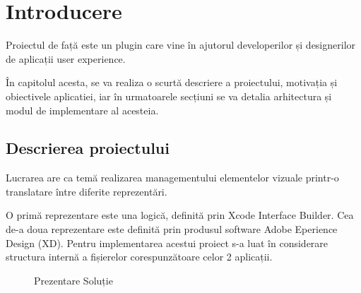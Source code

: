 \chapter{Introducere}
\label{chapter:intro}

\par Proiectul de față este un plugin care vine în ajutorul developerilor și designerilor de aplicații user experience.
\par În capitolul acesta, se va realiza o scurtă descriere a proiectului, motivația și obiectivele aplicatiei, iar  în urmatoarele secțiuni se va detalia arhitectura și modul de implementare al acesteia.

\section{Descrierea proiectului}
\label{sec:proj}
\par Lucrarea are ca temă realizarea managementului elementelor vizuale printr-o translatare între diferite reprezentări.  
\par O primă reprezentare este una logică, definită prin Xcode Interface Builder. Cea de-a doua reprezentare este definită prin produsul software Adobe Eperience Design (XD). 
Pentru implementarea acestui proiect s-a luat în considerare structura internă a fișierelor corespunzătoare celor 2 aplicații.

\begin{figure}[!htbp]
\centering
{}
\caption{Prezentare Soluție} \label{fig:Prezentare}
\end{figure}

